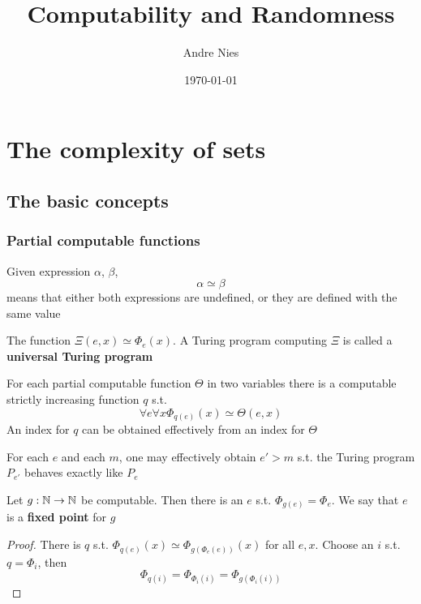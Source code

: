 \documentclass[11pt]{article}
\author{Andre Nies}
\date{\today}
\title{Computability and Randomness}
\begin{document}
\maketitle
\tableofcontents


\section{The complexity of sets}
\label{sec:orgfcef0e4}
\subsection{The basic concepts}
\label{sec:org32b3157}
\subsubsection{Partial computable functions}
\label{sec:org5e53717}
Given expression \(\alpha\), \(\beta\),
\begin{equation*}
\alpha\simeq\beta
\end{equation*}
means that either both expressions are undefined, or they are defined with the same value

The function \(\Xi(e,x)\simeq\Phi_e(x)\). A Turing program computing \(\Xi\) is called a \textbf{universal Turing program}

\begin{theorem}
For each partial computable function \(\Theta\) in two variables there is a computable strictly
increasing function \(q\) s.t.
\begin{equation*}
\forall e\forall x\Phi_{q(e)}(x)\simeq\Theta(e,x)
\end{equation*}
An index for \(q\) can be obtained effectively from an index for \(\Theta\)
\end{theorem}

\begin{lemma}
For each \(e\) and each \(m\), one may effectively obtain \(e'>m\) s.t. the Turing
program \(P_{e'}\) behaves exactly like \(P_e\)
\end{lemma}

\begin{theorem}
\label{1.1.5}
Let \(g:\mathbb{N}\to\mathbb{N}\) be computable. Then there is an \(e\) s.t. \(\Phi_{g(e)}=\Phi_e\). We say that \(e\) is a
\textbf{fixed point} for \(g\)
\end{theorem}

\begin{proof}
There is \(q\) s.t. \(\Phi_{q(e)}(x)\simeq\Phi_{g(\Phi_e(e))}(x)\) for all \(e,x\). Choose an \(i\)
s.t. \(q=\Phi_i\), then
\begin{equation*}
\Phi_{q(i)}=\Phi_{\Phi_i(i)}=\Phi_{g(\Phi_i(i))}
\end{equation*}
\end{proof}
\end{document}
